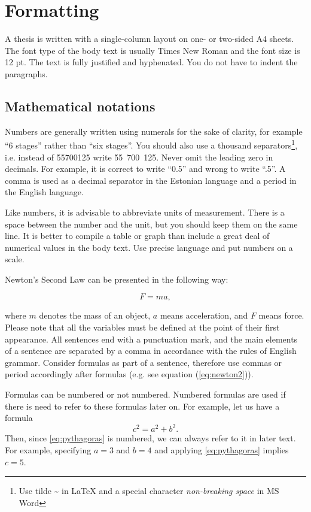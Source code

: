 \section{Formatting}  

A thesis is written with a single-column layout on one- or two-sided
A4 sheets. The font type of the body text is usually Times New Roman 
and the font size is 12 pt. The text is fully justified and hyphenated.
You do not have to indent the paragraphs.

\subsection{Mathematical notations}

Numbers are generally written using numerals for the sake of clarity,
for example ``6 stages'' rather than ``six stages''. You should
also use a thousand separators\footnote{Use tilde \~{} in LaTeX and a
  special character \textit{non-breaking space} in MS Word},
i.e. instead of 55700125 write 55~700~125. Never omit the leading zero
in decimals. For example, it is correct to write ``0.5'' and wrong to
write ``.5''. A comma is used as a decimal separator in the Estonian
language and a period in the English language.

Like numbers, it is advisable to abbreviate units of
measurement. There is a space between the number and the unit, but you
should keep them on the same line. It is better to compile a table or
graph than include a great deal of numerical values in the body
text. Use precise language and put numbers on a scale.

Newton's Second Law can be presented in the following way:

\begin{equation}
  \label{eq:newton2}
 F = ma,
\end{equation}

where $m$ denotes the mass of an object, $a$ means acceleration, and
$F$ means force. Please note that all the variables must be defined at
the point of their first appearance. All sentences end with a
punctuation mark, and the main elements of a sentence are separated by
a comma in accordance with the rules of English grammar. Consider formulas 
as part of a sentence, therefore use commas or period accordingly after 
formulas (e.g. see equation (\ref{eq:newton2})).

Formulas can be numbered or not numbered. Numbered formulas are used if there is need to refer to these formulas later on. For example, let us have a formula
\begin{equation}\label{eq:pythagoras}
c^2=a^2+b^2.
\end{equation}
Then, since \eqref{eq:pythagoras} is numbered, we can always refer to it in later text. For example, specifying $a=3$ and $b=4$ and applying \eqref{eq:pythagoras} implies $c=5$.

